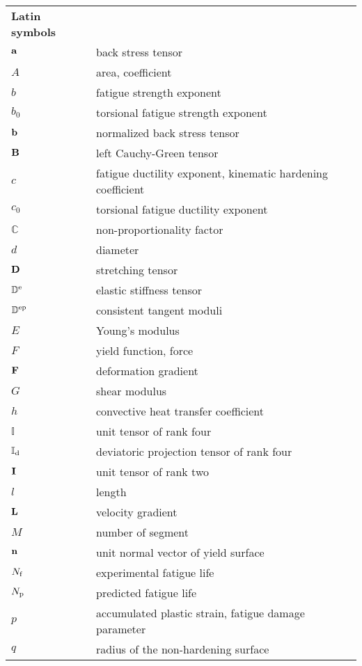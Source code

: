 \begin{table}[htb]
  \centering
    \begin{tabular}{p{3cm}p{10.5cm}}
    \textbf{Latin symbols} & \\
    $\bf{a}$ & back stress tensor \\
    $A$ & area, coefficient \\
    $b$ & fatigue strength exponent \\
    $b_0$ & torsional fatigue strength exponent \\
    $\bf{b}$ & normalized back stress tensor \\
    $\bf{B}$ & left Cauchy-Green tensor \\
    $c$ & fatigue ductility exponent, kinematic hardening coefficient \\
    $c_0$ & torsional fatigue ductility exponent \\
    $\mathbb{C}$ & non-proportionality factor \\
    $d$  & diameter \\
    $\bf{D}$ & stretching tensor \\
    $\mathbb{D}^{\rm{e}}$ & elastic stiffness tensor \\
    $\mathbb{D}^{\rm{ep}}$ & consistent tangent moduli \\
    $E$   & Young's modulus \\
    $F$   & yield function, force \\
    $\bf{F}$ & deformation gradient \\
    $G$   & shear modulus \\
    $h$ & convective heat transfer coefficient \\
    $\mathbb{I}$ & unit tensor of rank four \\
    $\mathbb{I}_{\rm{d}}$ & deviatoric projection tensor of rank four \\
    $\bf{I}$ & unit tensor of rank two \\
    $l$ & length \\
    $\bf{L}$ & velocity gradient \\
    $M$ & number of segment \\
    $\bf{n}$ & unit normal vector of yield surface \\
    $N_{\rm{f}}$ & experimental fatigue life \\
    $N_{\rm{p}}$ & predicted fatigue life \\
    $p$   & accumulated plastic strain, fatigue damage parameter \\
    $q$   & radius of the non-hardening surface \\

\end{tabular}
\end{table}
